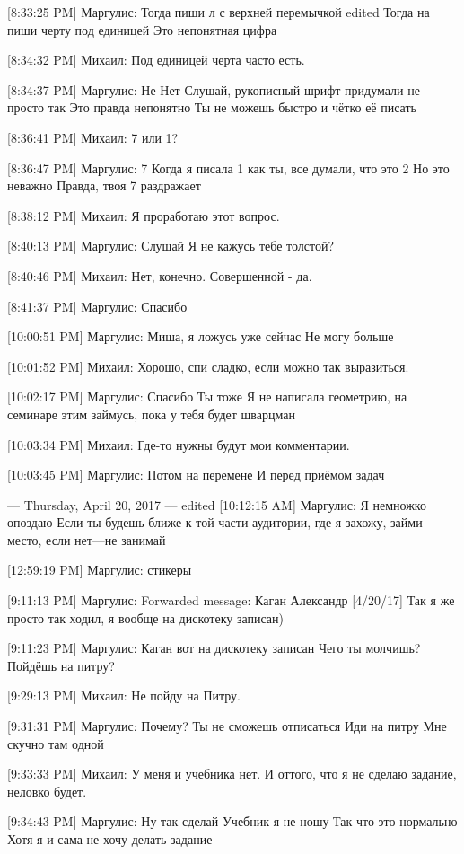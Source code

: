 \documentclass{article}
\begin{document}
[8:33:25 PM] Маргулис:
Тогда пиши л с верхней перемычкой
edited 
Тогда на пиши черту под единицей
 Это непонятная цифра

[8:34:32 PM] Михаил:
Под единицей черта часто есть.

[8:34:37 PM] Маргулис:
Не
 Нет
 Слушай, рукописный шрифт придумали не просто так
 Это правда непонятно
 Ты не можешь быстро и чётко её писать

[8:36:41 PM] Михаил:
7 или 1?

[8:36:47 PM] Маргулис:
7
 Когда я писала 1 как ты, все думали, что это 2
 Но это неважно
 Правда, твоя 7 раздражает

[8:38:12 PM] Михаил:
Я проработаю этот вопрос.

[8:40:13 PM] Маргулис:
Слушай
 Я не кажусь тебе толстой?

[8:40:46 PM] Михаил:
Нет, конечно.
 Совершенной - да.

[8:41:37 PM] Маргулис:
Спасибо

[10:00:51 PM] Маргулис:
Миша, я ложусь уже сейчас
 Не могу больше

[10:01:52 PM] Михаил:
Хорошо, спи сладко, если можно так выразиться.

[10:02:17 PM] Маргулис:
Спасибо
 Ты тоже
 Я не написала геометрию, на семинаре этим займусь, пока у тебя будет шварцман

[10:03:34 PM] Михаил:
Где-то нужны будут мои комментарии.

[10:03:45 PM] Маргулис:
Потом на перемене
 И перед приёмом задач

--- Thursday, April 20, 2017 ---
edited 
[10:12:15 AM] Маргулис:
Я немножко опоздаю
 Если ты будешь ближе к той части аудитории, где я захожу, займи место, если нет—не занимай

[12:59:19 PM] Маргулис:
стикеры

[9:11:13 PM] Маргулис:
Forwarded message: 
Каган Александр [4/20/17] 
Так я же просто так ходил, я вообще на дискотеку записан)

[9:11:23 PM] Маргулис:
Каган вот на дискотеку записан
 Чего ты молчишь?
 Пойдёшь на питру?

[9:29:13 PM] Михаил:
Не пойду на Питру.

[9:31:31 PM] Маргулис:
Почему?
 Ты не сможешь отписаться
 Иди на питру
 Мне скучно там одной

[9:33:33 PM] Михаил:
У меня и учебника нет. И оттого, что я не сделаю задание, неловко будет.

[9:34:43 PM] Маргулис:
Ну так сделай
 Учебник я не ношу
 Так что это нормально
 Хотя я и сама не хочу делать задание
\end{document}

